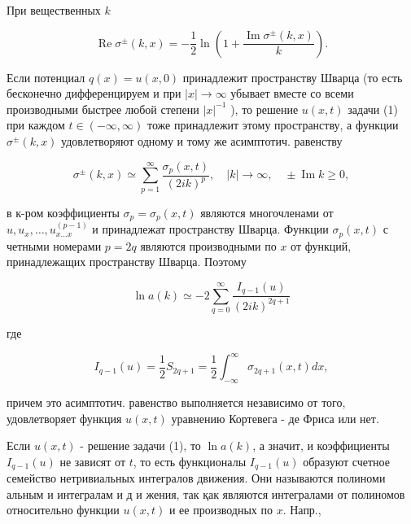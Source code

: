 \documentclass[10pt]{article}
\begin{document}
При вещественных $k$



\[

\operatorname{Re} \sigma^{ \pm}(k, x)=-\frac{1}{2} \ln \left(1+\frac{\operatorname{Im} \sigma^{ \pm}(k, x)}{k}\right) .

\]



Если потенциал $q(x)=u(x, 0)$ принадлежит пространству Шварца (то есть бесконечно дифференцируем и при $|x| \rightarrow \infty$ убывает вместе со всеми производными быстрее любой степени $|x|^{-1}$ ), то решение $u(x, t)$ задачи (1) при каждом $t \in(-\infty, \infty)$ тоже принадлежит этому пространству, а функции $\sigma^{ \pm}(k, x)$ удовлетворяют одному и тому же асимптотич. равенству



\[

\sigma^{ \pm}(k, x) \simeq \sum_{p=1}^{\infty} \frac{\sigma_{p}(x, t)}{(2 i k)^{p}}, \quad|k| \rightarrow \infty, \quad \pm \operatorname{Im} k \geqslant 0,

\]



в к-ром коэффициенты $\sigma_{p}=\sigma_{p}(x, t)$ являются многочленами от $u, u_{x}, \ldots, u_{x \ldots x}^{(p-1)}$ и принадлежат пространству Шварца. Функции $\sigma_{p}(x, t)$ с четными номерами $p=2 q$ являются производными по $x$ от функций, принадлежащих пространству Шварца. Поэтому



\[

\ln a(k) \simeq-2 \sum_{q=0}^{\infty} \frac{I_{q-1}(u)}{(2 i k)^{2 q+1}}

\]



где



\[

I_{q-1}(u)=\frac{1}{2} S_{2 q+1}=\frac{1}{2} \int_{-\infty}^{\infty} \sigma_{2 q+1}(x, t) d x,

\]



причем это асимптотич. равенство выполняется независимо от того, удовлетворяет функция $u(x, t)$ уравнению Кортевега - де Фриса или нет.



Если $u(x, t)$ - решение задачи (1), то $\ln a(k)$, а значит, и коэффициенты $I_{q-1}(u)$ не зависят от $t$, то есть функционалы $I_{q-1}(u)$ образуют счетное семейство нетривиальных интегралов движения. Они называются полиноми альным и интегралам и д и жения, так қак являются интегралами от полиномов относительно функции $u(x, t)$ и ее производных по $x$. Напр.,
\end{document}
